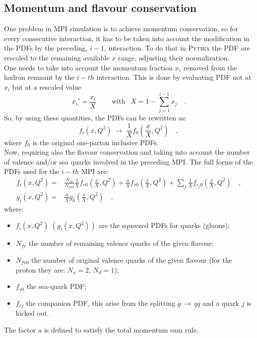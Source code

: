 \subsection{Momentum and flavour conservation}

One problem in MPI simulation is to achieve momentum conservation, so for every consecutive interaction, it has to be taken into account the modification in the PDFs by the preceding, $i-1$, interaction. To do that in \textsc{Pythia} the PDF are rescaled to the remaining available $x$ range, adjusting their normalization.
\\
One needs to take into account the momentum fraction $x_i$ removed from the hadron remnant by the $i-th$ interaction. This is done by evaluating PDF not at $x_i$ but at a rescaled value
\begin{equation}
	x_i'=\frac{x_i}{X} \qquad \ \text{with }\ \ X=1-\sum_{j=1}^{i-1}x_j\quad .
\end{equation}
So, by using these quantities, the PDFs can be rewritten as:
\begin{equation}
	f_i(x,Q^2)\ \longrightarrow\ \frac{1}{X}f_0\left(\frac{x}{X},Q^2\right)\quad ,
\end{equation}
where $f_0$ is the original one-parton inclusive PDFs.
\\
Now, requiring also the flavour conservation and taking into account the number of valence and/or sea quarks involved in the preceding MPI. The full forms of the PDFs used for the $i-th$ MPI are:
\begin{align}
f_i(x,Q^2) =&  \frac{N_{fv}}{N_{fv0}}\frac{1}{X} f_{v0}\left( \frac{x}{X},Q^2 \right) + \frac{a}{X}f_{s0}\left( \frac{x}{X},Q^2 \right)+\displaystyle\sum_j \frac{1}{X} f_{c_j0}\left( \frac{x}{X},Q^2 \right) \quad,\\
g_i(x,Q^2) =& \frac{a}{X}g_0\left( \frac{x}{X},Q^2 \right)\quad, 
\end{align}
where: 
\begin{itemize}
	\item $f_i(x,Q^2)$ $(g_i(x,Q^2))$ are the squeezed PDFs for quarks (gluons);
	\item $N_{fv}$ the number of remaining valence quarks of the given flavour;
	\item $N_{fv0}$ the number of original valence quarks of the given flavour (for the proton they are: $N_u=2$, $N_d=1$);
	\item $f_{s0}$ the sea-quark PDF;
	\item $f_{cj}$ the companion PDF, this arise from the splitting $g\,\rightarrow\,q\overline{q}$ and a quark $j$ is kicked out.
\end{itemize}
The factor $a$ is defined to satisfy the total momentum sum rule.

